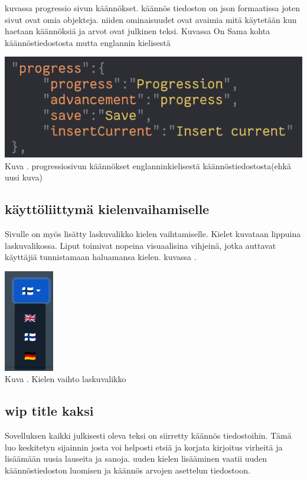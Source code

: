 \documentclass[11pt,a4paper,titlepage,oneside]{article}
\begin{document}
kuvassa progressio sivun käännökset. käännös tiedoston on json formaatissa joten sivut ovat omia objekteja. 
niiden ominaisuudet ovat avaimia mitä käytetään kun haetaan käännöksiä ja arvot ovat julkinen teksi.
Kuvassa \nextImageCount {} On Sama kohta käännöstiedostosta mutta englannin kielisestä
\medskip
\bigskip


\includegraphics[width = 15cm]{src/public/oppar/translationfileEng.png}\\
Kuva \getImgCount {}. progressiosivun käännökset englanninkielisestä käännöstiedostosta(ehkä uusi kuva)
\medskip




\subsection{käyttöliittymä kielenvaihamiselle}

Sivulle on myös lisätty laskuvalikko kielen vaihtamiselle. 
Kielet kuvataan lippuina laskuvalikossa.
Liput toimivat nopeina visuaalisina vihjeinä, jotka auttavat käyttäjiä tunnistamaan haluamansa kielen.
kuvassa \nextImageCount.



\bigskip
\includegraphics[]{src/public/locale_laskuvalikko.png}\\
Kuva \getImgCount {}. Kielen vaihto laskuvalikko


\subsection{wip title kaksi}
Sovelluksen kaikki julkisesti oleva teksi on siirretty käännös tiedostoihin. 
Tämä luo keskitetyn sijainnin josta voi helposti etsiä ja korjata kirjoitus virheitä ja lisäämään uusia lauseita ja sanoja.
uuden kielen lisääminen vaatii uuden käännöstiedoston luomisen ja käännös arvojen asettelun tiedostoon.
\medskip
\end{document}
